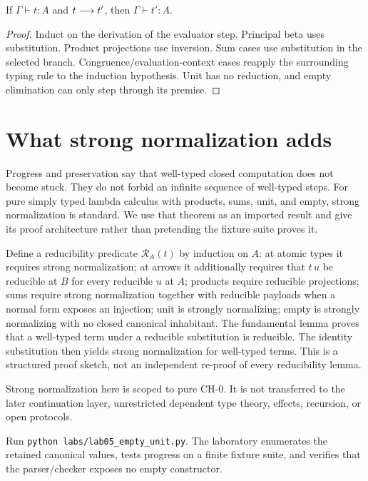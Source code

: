 \begin{theorem}
If $\Gamma\vdash t:A$ and $t\mathrel{\longrightarrow} t'$, then $\Gamma\vdash t':A$.
\end{theorem}
\begin{proof}
Induct on the derivation of the evaluator step. Principal beta uses substitution. Product projections use inversion. Sum cases use substitution in the selected branch. Congruence/evaluation-context cases reapply the surrounding typing rule to the induction hypothesis. Unit has no reduction, and empty elimination can only step through its premise.
\end{proof}



\section{What strong normalization adds}
Progress and preservation say that well-typed closed computation does not become stuck. They do not forbid an infinite sequence of well-typed steps. For pure simply typed lambda calculus with products, sums, unit, and empty, strong normalization is standard. We use that theorem as an imported result and give its proof architecture rather than pretending the fixture suite proves it.

Define a reducibility predicate $\mathcal{R}_A(t)$ by induction on $A$: at atomic types it requires strong normalization; at arrows it additionally requires that $t\,u$ be reducible at $B$ for every reducible $u$ at $A$; products require reducible projections; sums require strong normalization together with reducible payloads when a normal form exposes an injection; unit is strongly normalizing; empty is strongly normalizing with no closed canonical inhabitant. The fundamental lemma proves that a well-typed term under a reducible substitution is reducible. The identity substitution then yields strong normalization for well-typed terms. This is a structured proof sketch, not an independent re-proof of every reducibility lemma.

\begin{warningbox}
Strong normalization here is scoped to pure $\mathrm{CH}\text{-}0$. It is not transferred to the later continuation layer, unrestricted dependent type theory, effects, recursion, or open protocols.
\end{warningbox}

\begin{labbox}
Run \texttt{python labs/lab05_empty_unit.py}. The laboratory enumerates the retained canonical values, tests progress on a finite fixture suite, and verifies that the parser/checker exposes no empty constructor.
\end{labbox}


